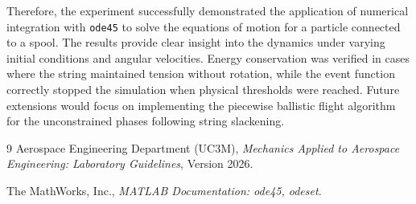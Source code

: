 \documentclass[11pt,a4paper]{article}
\begin{document}
Therefore, the experiment successfully demonstrated the application of numerical integration with \texttt{ode45} to solve the equations of motion for a particle connected to a spool. The results provide clear insight into the dynamics under varying initial conditions and angular velocities. Energy conservation was verified in cases where the string maintained tension without rotation, while the event function correctly stopped the simulation when physical thresholds were reached. Future extensions would focus on implementing the piecewise ballistic flight algorithm for the unconstrained phases following string slackening.

\begin{thebibliography}{9}
  Aerospace Engineering Department (UC3M),
  \emph{Mechanics Applied to Aerospace Engineering: Laboratory Guidelines}, Version 2026.

  The MathWorks, Inc.,
  \emph{MATLAB Documentation: ode45, odeset}.
\end{thebibliography}
\end{document}
